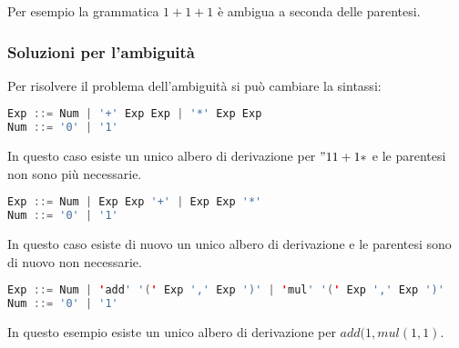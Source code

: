 Per esempio la grammatica $1+1+1$ è ambigua a seconda delle parentesi.

\subsubsection{Soluzioni per l'ambiguità}
Per risolvere il problema dell'ambiguità si può cambiare la sintassi:
\begin{lstlisting}[language=Java, caption={Notazione prefissa}]
Exp ::= Num | '+' Exp Exp | '*' Exp Exp
Num ::= '0' | '1'
\end{lstlisting}

In questo caso esiste un unico albero di derivazione per $"1 1+1*$ e le
parentesi non sono più necessarie.


\begin{lstlisting}[language=Java, caption={Notazione postfissa}]
Exp ::= Num | Exp Exp '+' | Exp Exp '*'
Num ::= '0' | '1'
\end{lstlisting}

In questo caso esiste di nuovo un unico albero di derivazione e le parentesi
sono di nuovo non necessarie.
 

\begin{lstlisting}[language=Java, caption={Notazione funzionale}]
Exp ::= Num | 'add' '(' Exp ',' Exp ')' | 'mul' '(' Exp ',' Exp ')'
Num ::= '0' | '1'
\end{lstlisting}

In questo esempio esiste un unico albero di derivazione per $add(1,mul(1,1)$.
